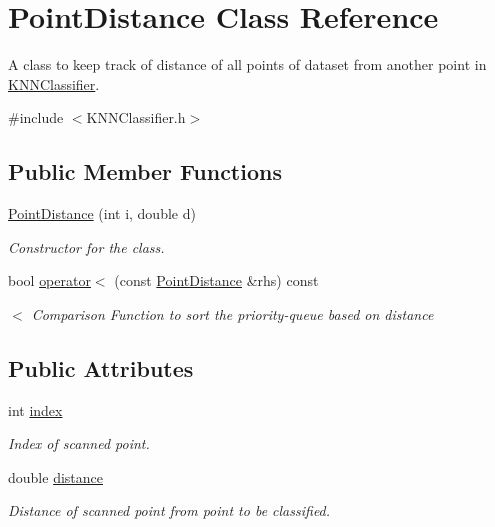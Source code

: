\hypertarget{classPointDistance}{}\section{Point\+Distance Class Reference}
\label{classPointDistance}


A class to keep track of distance of all points of dataset from another point in \hyperlink{classKNNClassifier}{K\+N\+N\+Classifier}.  




{\ttfamily \#include $<$K\+N\+N\+Classifier.\+h$>$}

\subsection*{Public Member Functions}
\begin{DoxyCompactItemize}
\item 
\hyperlink{classPointDistance_a172c423156ae61947c4521f691aae41c}{Point\+Distance} (int i, double d)
\begin{DoxyCompactList}\small\item\em Constructor for the class. \end{DoxyCompactList}\item 
\mbox{\label{classPointDistance_a601a484945b513defcf0025920752538}} 
bool \hyperlink{classPointDistance_a601a484945b513defcf0025920752538}{operator$<$} (const \hyperlink{classPointDistance}{Point\+Distance} \&rhs) const
\begin{DoxyCompactList}\small\item\em $<$ Comparison Function to sort the priority-\/queue based on distance \end{DoxyCompactList}\end{DoxyCompactItemize}
\subsection*{Public Attributes}
\begin{DoxyCompactItemize}
\item 
\mbox{\label{classPointDistance_a784d7faf4d2fc1f8f53162f405da880a}} 
int \hyperlink{classPointDistance_a784d7faf4d2fc1f8f53162f405da880a}{index}
\begin{DoxyCompactList}\small\item\em Index of scanned point. \end{DoxyCompactList}\item 
\mbox{\label{classPointDistance_a07905cda86de2ae4b44fc7cea12a1a93}} 
double \hyperlink{classPointDistance_a07905cda86de2ae4b44fc7cea12a1a93}{distance}
\begin{DoxyCompactList}\small\item\em Distance of scanned point from point to be classified. \end{DoxyCompactList}\end{DoxyCompactItemize}


